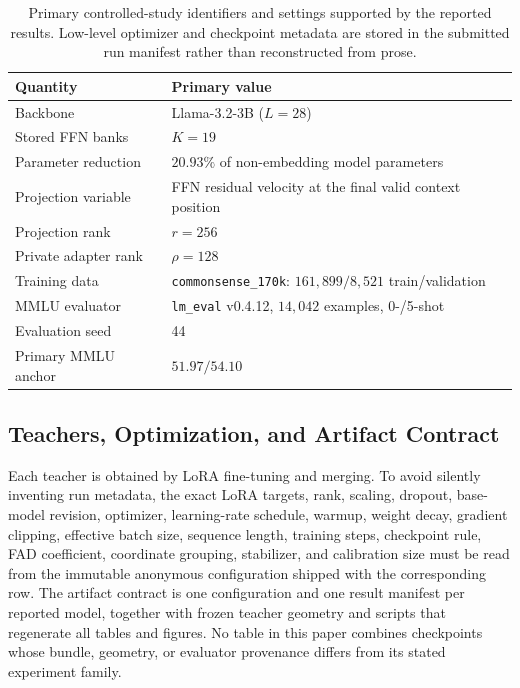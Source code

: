 \documentclass{article}
\theoremstyle{plain}
\theoremstyle{definition}
\theoremstyle{remark}
\begin{document}
\begin{table}[H]
\caption{Primary controlled-study identifiers and settings supported by the
reported results.  Low-level optimizer and checkpoint metadata are stored in the
submitted run manifest rather than reconstructed from prose.}
\label{tab:app-primary-config}
\centering
\small
\setlength{\tabcolsep}{7pt}
\renewcommand{\arraystretch}{1.04}
\begin{tabular}{@{}ll@{}}
\toprule
\textbf{Quantity} & \textbf{Primary value}\\
\midrule
Backbone & Llama-3.2-3B ($L=28$)\\
Stored FFN banks & $K=19$\\
Parameter reduction & $20.93\%$ of non-embedding model parameters\\
Projection variable & FFN residual velocity at the final valid context position\\
Projection rank & $r=256$\\
Private adapter rank & $\rho=128$\\
Training data & \texttt{commonsense\_170k}: $161{,}899/8{,}521$ train/validation\\
MMLU evaluator & \texttt{lm\_eval} v0.4.12, $14{,}042$ examples, 0-/5-shot\\
Evaluation seed & 44\\
Primary MMLU anchor & $51.97/54.10$\\
\bottomrule
\end{tabular}
\end{table}

\subsection{Teachers, Optimization, and Artifact Contract}

Each teacher is obtained by LoRA fine-tuning and merging.  To avoid silently
inventing run metadata, the exact LoRA targets, rank, scaling, dropout, base-model
revision, optimizer, learning-rate schedule, warmup, weight decay, gradient
clipping, effective batch size, sequence length, training steps, checkpoint rule,
FAD coefficient, coordinate grouping, stabilizer, and calibration size must be read
from the immutable anonymous configuration shipped with the corresponding row.
The artifact contract is one configuration and one result manifest per reported
model, together with frozen teacher geometry and scripts that regenerate all tables
and figures.  No table in this paper combines checkpoints whose bundle, geometry,
or evaluator provenance differs from its stated experiment family.
\end{document}
